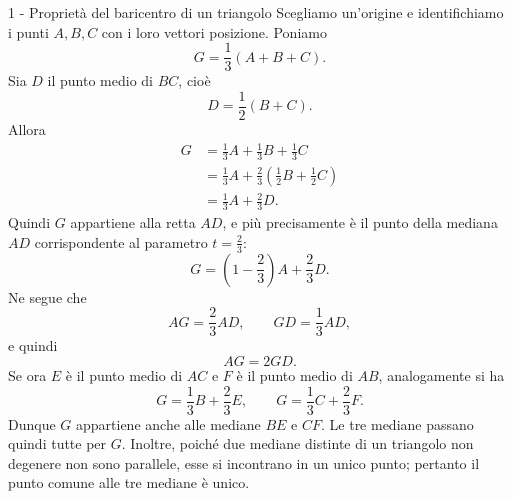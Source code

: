 \documentclass[a4paper]{article}
\begin{document}
\begin{snippetsolution}{1 - Proprietà del baricentro di un triangolo}
    Scegliamo un'origine e identifichiamo i punti \(A,B,C\) con i loro vettori posizione. Poniamo
    \[
        G = \frac13(A+B+C).
    \]
    Sia \(D\) il punto medio di \(BC\), cioè
    \[
        D = \frac12(B+C).
    \]
    Allora
    \begin{align*}
        G &= \frac13 A + \frac13 B + \frac13 C \\
          &= \frac13 A + \frac23 \left(\frac12B+\frac12C\right) \\
          &= \frac13 A + \frac23 D.
    \end{align*}
    Quindi \(G\) appartiene alla retta \(AD\), e più precisamente è il punto della mediana \(AD\) corrispondente al parametro \(t=\frac23\):
    \[
        G = \left(1-\frac23\right)A+\frac23D.
    \]
    Ne segue che
    \[
        AG = \frac23AD,
        \qquad
        GD = \frac13AD,
    \]
    e quindi
    \[
        AG = 2GD.
    \]
    Se ora \(E\) è il punto medio di \(AC\) e \(F\) è il punto medio di \(AB\), analogamente si ha
    \[
        G = \frac13B+\frac23E,
        \qquad
        G = \frac13C+\frac23F.
    \]
    Dunque \(G\) appartiene anche alle mediane \(BE\) e \(CF\). Le tre mediane passano quindi tutte per \(G\). Inoltre, poiché due mediane distinte di un triangolo non degenere non sono parallele, esse si incontrano in un unico punto; pertanto il punto comune alle tre mediane è unico.
\end{snippetsolution}
\end{document}
